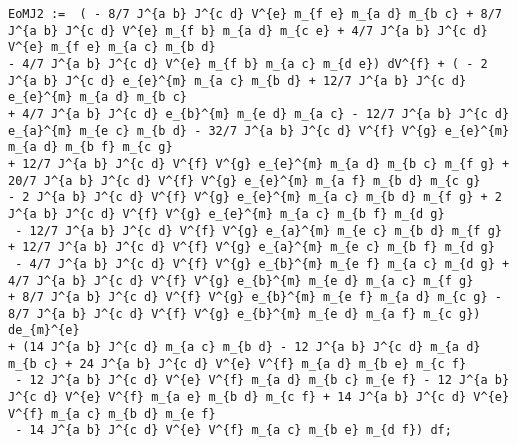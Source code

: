 \documentclass[11pt]{article}
\begin{document}
{\color[named]{Blue}\begin{verbatim}
EoMJ2 :=  ( - 8/7 J^{a b} J^{c d} V^{e} m_{f e} m_{a d} m_{b c} + 8/7 J^{a b} J^{c d} V^{e} m_{f b} m_{a d} m_{c e} + 4/7 J^{a b} J^{c d} V^{e} m_{f e} m_{a c} m_{b d} 
- 4/7 J^{a b} J^{c d} V^{e} m_{f b} m_{a c} m_{d e}) dV^{f} + ( - 2 J^{a b} J^{c d} e_{e}^{m} m_{a c} m_{b d} + 12/7 J^{a b} J^{c d} e_{e}^{m} m_{a d} m_{b c} 
+ 4/7 J^{a b} J^{c d} e_{b}^{m} m_{e d} m_{a c} - 12/7 J^{a b} J^{c d} e_{a}^{m} m_{e c} m_{b d} - 32/7 J^{a b} J^{c d} V^{f} V^{g} e_{e}^{m} m_{a d} m_{b f} m_{c g} 
+ 12/7 J^{a b} J^{c d} V^{f} V^{g} e_{e}^{m} m_{a d} m_{b c} m_{f g} + 20/7 J^{a b} J^{c d} V^{f} V^{g} e_{e}^{m} m_{a f} m_{b d} m_{c g} 
- 2 J^{a b} J^{c d} V^{f} V^{g} e_{e}^{m} m_{a c} m_{b d} m_{f g} + 2 J^{a b} J^{c d} V^{f} V^{g} e_{e}^{m} m_{a c} m_{b f} m_{d g}
 - 12/7 J^{a b} J^{c d} V^{f} V^{g} e_{a}^{m} m_{e c} m_{b d} m_{f g} + 12/7 J^{a b} J^{c d} V^{f} V^{g} e_{a}^{m} m_{e c} m_{b f} m_{d g}
 - 4/7 J^{a b} J^{c d} V^{f} V^{g} e_{b}^{m} m_{e f} m_{a c} m_{d g} + 4/7 J^{a b} J^{c d} V^{f} V^{g} e_{b}^{m} m_{e d} m_{a c} m_{f g} 
+ 8/7 J^{a b} J^{c d} V^{f} V^{g} e_{b}^{m} m_{e f} m_{a d} m_{c g} - 8/7 J^{a b} J^{c d} V^{f} V^{g} e_{b}^{m} m_{e d} m_{a f} m_{c g}) de_{m}^{e} 
+ (14 J^{a b} J^{c d} m_{a c} m_{b d} - 12 J^{a b} J^{c d} m_{a d} m_{b c} + 24 J^{a b} J^{c d} V^{e} V^{f} m_{a d} m_{b e} m_{c f}
 - 12 J^{a b} J^{c d} V^{e} V^{f} m_{a d} m_{b c} m_{e f} - 12 J^{a b} J^{c d} V^{e} V^{f} m_{a e} m_{b d} m_{c f} + 14 J^{a b} J^{c d} V^{e} V^{f} m_{a c} m_{b d} m_{e f}
 - 14 J^{a b} J^{c d} V^{e} V^{f} m_{a c} m_{b e} m_{d f}) df;
\end{verbatim}}
\end{document}

